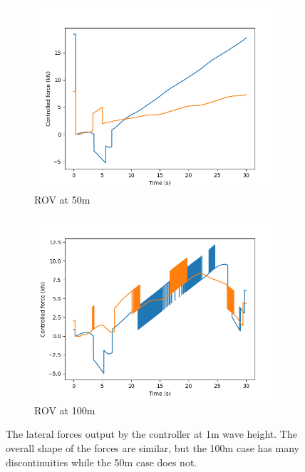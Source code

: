\documentclass[class=article, crop=false]{standalone}
\begin{document}
\begin{figure}
    \centering
    \begin{subfigure}{0.45\textwidth}
        \centering
        \includegraphics{scenario1/rov-50m/1.0m/usv_forces}
        \caption{ROV at 50m}
    \end{subfigure}
    \hfill
        \begin{subfigure}{0.45\textwidth}
        \centering
        \includegraphics{scenario1/rov-100m/1.0m/usv_forces}
        \caption{ROV at 100m}
    \end{subfigure}
    \caption{The lateral forces output by the controller at 1m wave height. The overall shape of the forces are similar, but the 100m case has many discontinuities while the 50m case does not.}
\end{figure}
\end{document}
